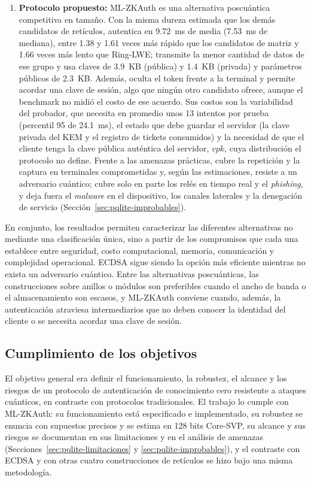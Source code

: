 \begin{enumerate}
    \item \textbf{Protocolo propuesto:} ML-ZKAuth es una alternativa poscuántica competitiva en tamaño. Con la misma dureza estimada que los demás candidatos de retículos, autentica en 9.72~ms de media (7.53~ms de mediana), entre 1.38 y 1.61 veces más rápido que los candidatos de matriz y 1.66 veces más lento que Ring-LWE; transmite la menor cantidad de datos de ese grupo y usa claves de 3.9~KB (pública) y 1.4~KB (privada) y parámetros públicos de 2.3~KB. Además, oculta el token frente a la terminal y permite acordar una clave de sesión, algo que ningún otro candidato ofrece, aunque el benchmark no midió el costo de ese acuerdo. Sus costos son la variabilidad del probador, que necesita en promedio unos 13 intentos por prueba (percentil 95 de 24.1~ms), el estado que debe guardar el servidor (la clave privada del KEM y el registro de tickets consumidos) y la necesidad de que el cliente tenga la clave pública auténtica del servidor, $vpk$, cuya distribución el protocolo no define. Frente a las amenazas prácticas, cubre la repetición y la captura en terminales comprometidas y, según las estimaciones, resiste a un adversario cuántico; cubre solo en parte los relés en tiempo real y el \textit{phishing}, y deja fuera el \textit{malware} en el dispositivo, los canales laterales y la denegación de servicio (Sección~\ref{sec:pqlite-improbables}).
\end{enumerate}

En conjunto, los resultados permiten caracterizar las diferentes alternativas no
mediante una clasificación única, sino a partir de los compromisos que cada una
establece entre seguridad, costo computacional, memoria, comunicación y complejidad
operacional. ECDSA sigue siendo la opción más eficiente mientras no exista un adversario
cuántico. Entre las alternativas poscuánticas, las construcciones sobre anillos o módulos
son preferibles cuando el ancho de banda o el almacenamiento son escasos, y ML-ZKAuth
conviene cuando, además, la autenticación atraviesa intermediarios que no deben conocer la
identidad del cliente o se necesita acordar una clave de sesión.


\subsection{Cumplimiento de los objetivos}

El objetivo general era definir el funcionamiento, la robustez, el alcance y los riesgos de
un protocolo de autenticación de conocimiento cero resistente a ataques cuánticos, en
contraste con protocolos tradicionales. El trabajo lo cumple con ML-ZKAuth: su
funcionamiento está especificado e implementado, su robustez se enuncia con supuestos
precisos y se estima en 128 bits Core-SVP, su alcance y sus riesgos se documentan en sus
limitaciones y en el análisis de amenazas (Secciones~\ref{sec:pqlite-limitaciones} y
\ref{sec:pqlite-improbables}), y el contraste con ECDSA y con otras cuatro construcciones de
retículos se hizo bajo una misma metodología.

